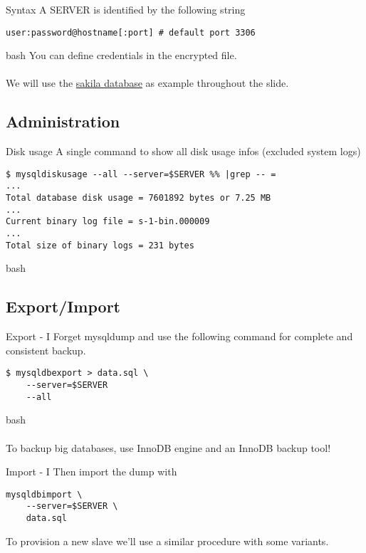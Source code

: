 \documentclass{beamer}[10]
\begin{document}
\begin{pyframe}{Syntax}
A SERVER is identified by the following string
\begin{verbatim}
user:password@hostname[:port] # default port 3306
\end{verbatim}{bash}
You can define credentials in the 
encrypted file.
\\\\
We will use the \href{http://dev.mysql.com/doc/index-other.html}
{sakila database} as example throughout
the slide.

\end{pyframe}

\subsection{Administration}
\begin{pyframe}{Disk usage}
A single command to show all disk usage infos (excluded system logs)

\begin{verbatim}
$ mysqldiskusage --all --server=$SERVER %% |grep -- =
...
Total database disk usage = 7601892 bytes or 7.25 MB
...
Current binary log file = s-1-bin.000009
...
Total size of binary logs = 231 bytes
\end{verbatim}{bash}
\end{pyframe}

%
%
\subsection{Export/Import}

\begin{pyframe}{Export - I}
Forget mysqldump and use the following
command for complete and consistent backup.
\begin{verbatim}
$ mysqldbexport > data.sql \
    --server=$SERVER
    --all
\end{verbatim}{bash}
\\\\
{
\large
To backup big databases, use InnoDB engine and an InnoDB backup tool!
}
\end{pyframe}


\begin{pyframe}{Import - I}
Then import the dump with
\begin{verbatim}
mysqldbimport \
    --server=$SERVER \
    data.sql
\end{verbatim}
To provision a new slave we'll use a similar
procedure with some variants.
\end{pyframe}
\end{document}
